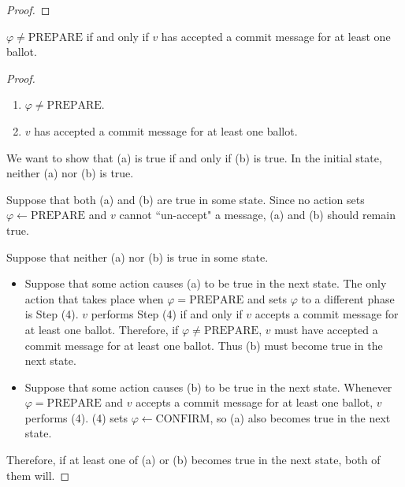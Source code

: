 \begin{proof}
\end{proof}

\begin{lem}
    $\varphi \ne \text{PREPARE}$ if and only if $v$ has accepted a commit message for at least one ballot.
\end{lem}

\begin{proof}
    $ $
    \begin{enumerate}[label=(\alph*)]
        \item
            $\varphi \ne \text{PREPARE}$.
        \item
            $v$ has accepted a commit message for at least one ballot.
    \end{enumerate}
    We want to show that (a) is true if and only if (b) is true.
    In the initial state, neither (a) nor (b) is true.

    Suppose that both (a) and (b) are true in some state.
    Since no action sets $\varphi \leftarrow \text{PREPARE}$ and $v$ cannot ``un-accept" a message, (a) and (b) should remain true.


    Suppose that neither (a) nor (b) is true in some state.

    \begin{itemize}
        \item
            Suppose that some action causes (a) to be true in the next state.
            The only action that takes place when $\varphi = \text{PREPARE}$ and sets $\varphi$ to a different phase is Step (4).
            $v$ performs Step (4) if and only if $v$ accepts a commit message for at least one ballot.
            Therefore, if $\varphi \ne \text{PREPARE}$, $v$ must have accepted a commit message for at least one ballot.
            Thus (b) must become true in the next state.
        \item
            Suppose that some action causes (b) to be true in the next state.
            Whenever $\varphi = \text{PREPARE}$ and $v$ accepts a commit message for at least one ballot, $v$ performs (4).
            (4) sets $\varphi \leftarrow \text{CONFIRM}$, so (a) also becomes true in the next state.
    \end{itemize}
    Therefore, if at least one of (a) or (b) becomes true in the next state, both of them will.
\end{proof}


